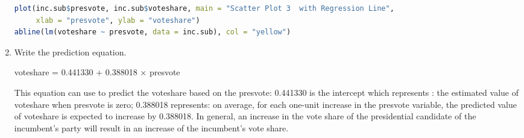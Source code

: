 \documentclass[12pt,letterpaper]{article}
\begin{document}
\begin{enumerate}
\begin{lstlisting}[language=R] 
plot(inc.sub$presvote, inc.sub$voteshare, main = "Scatter Plot 3  with Regression Line", 
     xlab = "presvote", ylab = "voteshare")
abline(lm(voteshare ~ presvote, data = inc.sub), col = "yellow")

\end{lstlisting} 
  
     \item Write the prediction equation.
     
voteshare =  0.441330  +   0.388018 × presvote


This equation can use to predict the voteshare based on the presvote: 0.441330 is the intercept which represents : the estimated value of voteshare when presvote is zero; 0.388018 represents:  on average, for each one-unit increase in the presvote variable, the  predicted value of voteshare is expected to increase by 0.388018. In general,  an increase in the vote share of the presidential candidate of the incumbent’s party will result in an increase of the incumbent’s vote share.
	\end{enumerate}



\newpage	
\end{document}
